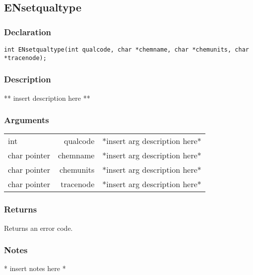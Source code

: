 \subsection{ENsetqualtype}
\subsubsection{Declaration}
\begin{lstlisting}
int ENsetqualtype(int qualcode, char *chemname, char *chemunits, char *tracenode);
\end{lstlisting}
\subsubsection{Description}
** insert description here **
\subsubsection{Arguments}
\begin{tabular}{l r p{11cm} }
int&qualcode&*insert arg description here* \\[6pt]
char pointer&chemname&*insert arg description here* \\[6pt]
char pointer&chemunits&*insert arg description here* \\[6pt]
char pointer&tracenode&*insert arg description here* \\[6pt]
\end{tabular}
\subsubsection{Returns}
Returns an error code.
\subsubsection{Notes}
* insert notes here *
